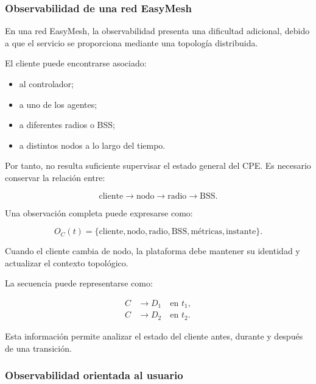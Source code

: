 \subsubsection*{Observabilidad de una red EasyMesh}

En una red EasyMesh, la observabilidad presenta una dificultad adicional,
debido a que el servicio se proporciona mediante una topología
distribuida.

El cliente puede encontrarse asociado:

\begin{itemize}
    \item al controlador;

    \item a uno de los agentes;

    \item a diferentes radios o BSS;

    \item a distintos nodos a lo largo del tiempo.
\end{itemize}

Por tanto, no resulta suficiente supervisar el estado general del CPE. Es
necesario conservar la relación entre:

\[
    \text{cliente}
    \longrightarrow
    \text{nodo}
    \longrightarrow
    \text{radio}
    \longrightarrow
    \text{BSS}.
\]

Una observación completa puede expresarse como:

\[
    O_C(t)
    =
    \{
        \text{cliente},
        \text{nodo},
        \text{radio},
        \text{BSS},
        \text{métricas},
        \text{instante}
    \}.
\]

Cuando el cliente cambia de nodo, la plataforma debe mantener su
identidad y actualizar el contexto topológico.

La secuencia puede representarse como:

\[
\begin{aligned}
    C
    &\longrightarrow
    D_1
    \quad
    \text{en } t_1,\\
    C
    &\longrightarrow
    D_2
    \quad
    \text{en } t_2.
\end{aligned}
\]

Esta información permite analizar el estado del cliente antes, durante y
después de una transición.


\subsubsection*{Observabilidad orientada al usuario}

